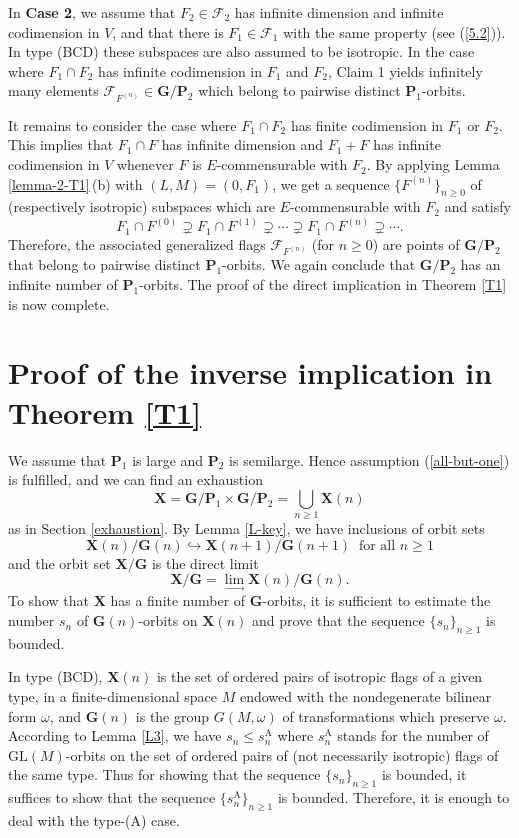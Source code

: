 \documentclass[12pt]{amsart}
\newcommand{\GL}{\mathrm{GL}}
\newcommand{\G}{\mathbf{G}}
\renewcommand{\P}{\mathbf{P}}
\newcommand{\X}{\mathbf{X}}
\newcommand{\Ff}{\mathcal{F}}
\numberwithin{equation}{section}
\theoremstyle{definition}
\begin{document}
In {\bf Case 2}, we assume that $F_2\in\Ff_2$ has infinite dimension and infinite codimension in $V$,
and that there is $F_1\in\Ff_1$ with the same property (see (\ref{5.2})).
In type (BCD) these subspaces are also assumed to be isotropic. In the case where $F_1\cap F_2$ has infinite codimension in $F_1$ and $F_2$, Claim 1 yields infinitely many elements $\Ff_{F^{(n)}}\in\G/\P_2$ which belong to pairwise distinct $\P_1$-orbits.

It remains to consider the case where $F_1\cap F_2$ has finite codimension in $F_1$ or $F_2$. This implies that $F_1\cap F$ has infinite dimension and $F_1+F$ has infinite codimension in $V$ whenever $F$ is $E$-commensurable with $F_2$. 
By applying Lemma \ref{lemma-2-T1}\,{\rm (b)} with $(L,M)=(0,F_1)$, we get a sequence $\{F^{(n)}\}_{n\geq 0}$ of (respectively isotropic) subspaces which are $E$-commensurable with $F_2$ and satisfy
\[F_1\cap F^{(0)}\supsetneq F_1\cap F^{(1)}\supsetneq\cdots\supsetneq F_1\cap F^{(n)}\supsetneq\cdots.\]
Therefore, the associated generalized flags $\Ff_{F^{(n)}}$ (for $n\geq 0$) are points of $\G/\P_2$ that belong to pairwise distinct $\P_1$-orbits. We again conclude that $\G/\P_2$ has an infinite number of $\P_1$-orbits. The proof of the direct implication in Theorem \ref{T1} is now complete.



\section{Proof of the inverse implication in Theorem \ref{T1}}

\label{section-6}

We assume that $\P_1$ is large and $\P_2$ is semilarge. Hence assumption (\ref{all-but-one}) is fulfilled, and we can find an exhaustion
\[\X=\G/\P_1\times \G/\P_2=\bigcup_{n\geq 1} \X(n)\]
as in Section \ref{exhaustion}. By Lemma \ref{L-key}, we have inclusions of orbit sets
\[
\X(n)/\G(n)\hookrightarrow\X(n+1)/\G(n+1)\ \mbox{ for all $n\geq 1$}
\]
and the orbit set $\X/\G$ is the direct limit
\[
\X/\G=\lim_\to \X(n)/\G(n).
\]
To show that $\X$ has a finite number of $\G$-orbits, it is sufficient to estimate the number $s_n$ of $\G(n)$-orbits on $\X(n)$ and prove that the sequence $\{s_n\}_{n\geq 1}$ is bounded.

In type (BCD), $\X(n)$ is the set of ordered pairs of isotropic flags of a given type, in a finite-dimensional space $M$ endowed with the nondegenerate bilinear form $\omega$, and $\G(n)$ is the group $G(M,\omega)$ of transformations which preserve $\omega$. According to Lemma \ref{L3}, we have
$s_n\leq s_n^\mathrm{A}$ where $s_n^\mathrm{A}$ stands for the number of $\GL(M)$-orbits on the set of ordered pairs of (not necessarily isotropic) flags of the same type. Thus for showing that the sequence $\{s_n\}_{n\geq 1}$ is bounded, it suffices to show that the sequence $\{s_n^\mathrm{A}\}_{n\geq 1}$ is bounded. Therefore, it is enough to deal with the type-(A) case.
\end{document}
